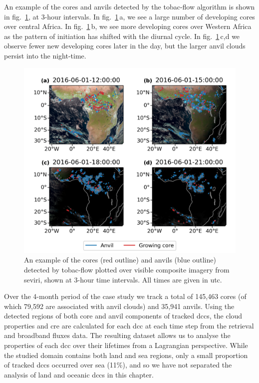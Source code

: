 An example of the cores and anvils detected by the tobac-flow algorithm is shown in fig.~\ref{fig:seviri_detection}, at 3-hour intervals. In fig.~\ref{fig:seviri_detection}\,a, we see a large number of developing cores over central Africa. 
In fig.~\ref{fig:seviri_detection}\,b, we see more developing cores over Western Africa as the pattern of initiation has shifted with the diurnal cycle.
In fig.~\ref{fig:seviri_detection}\,c,d we observe fewer new developing cores later in the day, but the larger anvil clouds persist into the night-time.


\begin{figure}[tp]
    \includegraphics[width=\textwidth]{figures/chapter4_07.png}
    \caption[
    An example of the cores and anvils (detected by tobac-flow, shown at 3-hour time intervals
    ]{
    An example of the cores (red outline) and anvils (blue outline) detected by tobac-flow plotted over visible composite imagery from \acrshort{seviri}, shown at 3-hour time intervals. All times are given in \acrshort{utc}.
    }
    \label{fig:seviri_detection}
\end{figure}


Over the 4-month period of the case study we track a total of 145,463 cores (of which 79,592 are associated with anvil clouds) and 35,941 anvils. 
Using the detected regions of both core and anvil components of tracked \acrshort{dcc}s, the cloud properties and \acrshort{cre} are calculated for each \acrshort{dcc} at each time step from the retrieval and broadband fluxes data. 
The resulting dataset allows us to analyse the properties of each \acrshort{dcc} over their lifetimes from a Lagrangian perspective.
While the studied domain contains both land and sea regions, only a small proportion of tracked \acrshort{dcc}s occurred over sea (11\%), and so we have not separated the analysis of land and oceanic \acrshort{dcc}s in this chapter.

